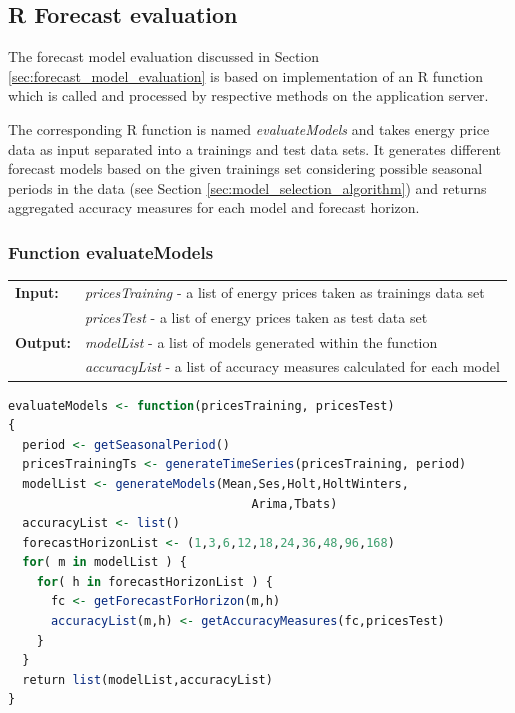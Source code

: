 \subsection{R Forecast evaluation}


The forecast model evaluation discussed in Section \ref{sec:forecast_model_evaluation} is based on implementation of an R function which is called and processed by respective methods on the application server. 

The corresponding R function is named \textit{evaluateModels} and takes energy price data as input separated into a trainings and test data sets. It generates different forecast models based on the given trainings set considering possible seasonal periods in the data (see Section \ref{sec:model_selection_algorithm}) and returns aggregated accuracy measures for each model and forecast horizon. 

\subsubsection{Function evaluateModels}

\begin{tabular}{ll}
\textbf{Input:}  & \textit{pricesTraining} - a list of energy prices taken as trainings data set \\
								 & \textit{pricesTest} - a list of energy prices taken as test data set \\
\textbf{Output:} & \textit{modelList} - a list of models generated within the function \\
								 & \textit{accuracyList} - a list of accuracy measures calculated for each model
\end{tabular}


\begin{lstlisting}[language=R, caption=Function evaluateModels, label={lst:evaluateModelsR}]
evaluateModels <- function(pricesTraining, pricesTest)
{
  period <- getSeasonalPeriod()
  pricesTrainingTs <- generateTimeSeries(pricesTraining, period)
  modelList <- generateModels(Mean,Ses,Holt,HoltWinters, 
	                              Arima,Tbats)						
  accuracyList <- list()
  forecastHorizonList <- (1,3,6,12,18,24,36,48,96,168)
  for( m in modelList ) {
    for( h in forecastHorizonList ) {
      fc <- getForecastForHorizon(m,h)
      accuracyList(m,h) <- getAccuracyMeasures(fc,pricesTest)
    }
  }
  return list(modelList,accuracyList)
}
\end{lstlisting}

